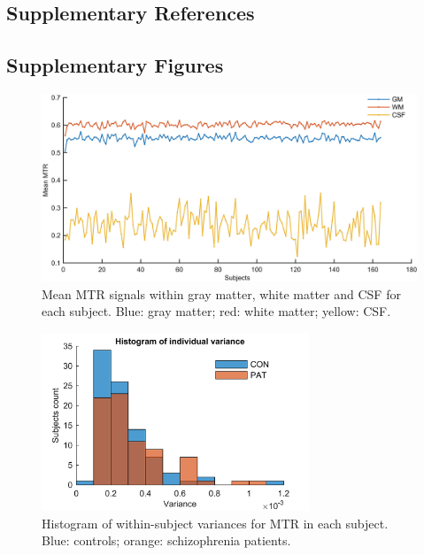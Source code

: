 \begin{refsection}
\subsection*{Supplementary References}
\printbibliography[heading=none]

\newpage
\subsection*{Supplementary Figures}
\begin{figure}[H]
\centering
  \includegraphics[width=\linewidth]{images/mtrFigS1.jpg}
  \caption{\small Mean MTR signals within gray matter, white matter and CSF for each subject. Blue: gray matter; red: white matter; yellow: CSF.}
  \label{mtrFigS1}
\end{figure}

\begin{figure}[H]
\centering
  \includegraphics[width=8cm]{images/mtrFigS2.png}
  \caption{\small Histogram of within-subject variances for MTR in each subject. Blue: controls; orange: schizophrenia patients.}
  \label{mtrFigS2}
\end{figure}


\end{refsection}
